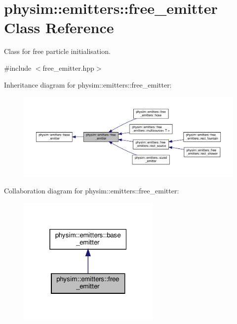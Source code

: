 \hypertarget{classphysim_1_1emitters_1_1free__emitter}{}\section{physim\+:\+:emitters\+:\+:free\+\_\+emitter Class Reference}
\label{classphysim_1_1emitters_1_1free__emitter}


Class for free particle initialisation.  




{\ttfamily \#include $<$free\+\_\+emitter.\+hpp$>$}



Inheritance diagram for physim\+:\+:emitters\+:\+:free\+\_\+emitter\+:\nopagebreak
\begin{figure}[H]
\begin{center}
\leavevmode
\includegraphics[width=350pt]{classphysim_1_1emitters_1_1free__emitter__inherit__graph}
\end{center}
\end{figure}


Collaboration diagram for physim\+:\+:emitters\+:\+:free\+\_\+emitter\+:\nopagebreak
\begin{figure}[H]
\begin{center}
\leavevmode
\includegraphics[width=196pt]{classphysim_1_1emitters_1_1free__emitter__coll__graph}
\end{center}
\end{figure}
